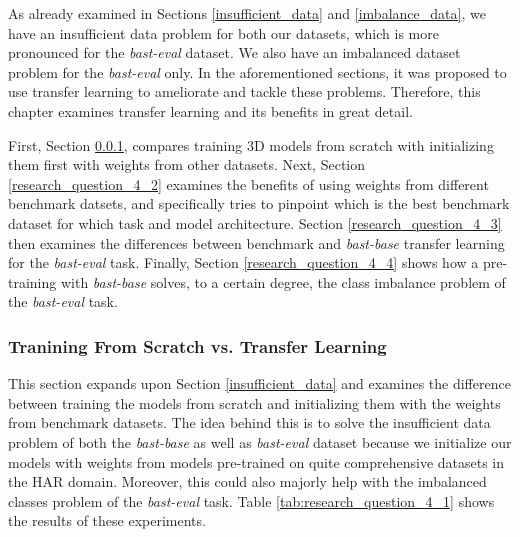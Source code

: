 \documentclass[extern,palatino]{cgMA}
\begin{document}
\bigskip \bigskip

\noindent As already examined in Sections \ref{insufficient_data} and \ref{imbalance_data}, we have an insufficient data problem for both our datasets, which is more pronounced for the \textit{bast-eval} dataset. We also have an imbalanced dataset problem for the \textit{bast-eval} only. In the aforementioned sections, it was proposed to use transfer learning to ameliorate and tackle these problems. Therefore, this chapter examines transfer learning and its benefits in great detail. 

First, Section \ref{research_question_4_1}, compares training 3D models from scratch with initializing them first with weights from other datasets. Next, Section \ref{research_question_4_2} examines the benefits of using weights from different benchmark datsets, and specifically tries to pinpoint which is the best benchmark dataset for which task and model architecture. Section \ref{research_question_4_3} then examines the differences between benchmark and \textit{bast-base} transfer learning for the \textit{bast-eval} task. Finally, Section \ref{research_question_4_4} shows how a pre-training with \textit{bast-base} solves, to a certain degree,  the class imbalance problem of the \textit{bast-eval} task.

\subsubsection{Tranining From Scratch vs. Transfer Learning}
\label{research_question_4_1}

This section expands upon Section \ref{insufficient_data} and examines the difference between training the models from scratch and initializing them with the weights from benchmark datasets. The idea behind this is to solve the insufficient data problem of both the \textit{bast-base} as well as \textit{bast-eval} dataset because we initialize our models with weights from models pre-trained on quite comprehensive datasets in the HAR domain. Moreover, this could also majorly help with the imbalanced classes problem of the \textit{bast-eval} task. Table \ref{tab:research_question_4_1} shows the results of these experiments.
\end{document}
